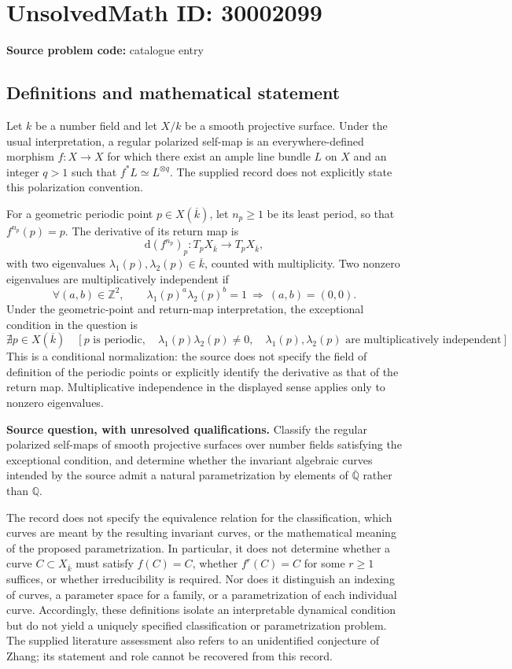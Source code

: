 \documentclass[11pt]{article}
\newcommand{\Z}{\mathbb{Z}}
\newcommand{\Q}{\mathbb{Q}}
\begin{document}
\section*{UnsolvedMath ID: 30002099}
\textbf{Source problem code:} catalogue entry
\subsection{Definitions and mathematical statement}
Let \(k\) be a number field and let \(X/k\) be a smooth projective surface. Under the usual interpretation, a regular polarized self-map is an everywhere-defined morphism \(f\colon X\to X\) for which there exist an ample line bundle \(L\) on \(X\) and an integer \(q>1\) such that \(f^*L\simeq L^{\otimes q}\). The supplied record does not explicitly state this polarization convention.

For a geometric periodic point \(p\in X(\overline{k})\), let \(n_p\geq 1\) be its least period, so that \(f^{n_p}(p)=p\). The derivative of its return map is
\[
\mathrm{d}(f^{n_p})_p\colon T_pX_{\overline{k}}\longrightarrow T_pX_{\overline{k}},
\]
with two eigenvalues \(\lambda_1(p),\lambda_2(p)\in\overline{k}\), counted with multiplicity. Two nonzero eigenvalues are multiplicatively independent if
\[
\forall(a,b)\in\Z^2,\qquad
\lambda_1(p)^a\lambda_2(p)^b=1
\ \Longrightarrow\ (a,b)=(0,0).
\]
Under the geometric-point and return-map interpretation, the exceptional condition in the question is
\[
\nexists p\in X(\overline{k})\quad
\left[
 p\text{ is periodic},\quad
 \lambda_1(p)\lambda_2(p)\ne 0,\quad
 \lambda_1(p),\lambda_2(p)\text{ are multiplicatively independent}
\right].
\]
This is a conditional normalization: the source does not specify the field of definition of the periodic points or explicitly identify the derivative as that of the return map. Multiplicative independence in the displayed sense applies only to nonzero eigenvalues.

\textbf{Source question, with unresolved qualifications.} Classify the regular polarized self-maps of smooth projective surfaces over number fields satisfying the exceptional condition, and determine whether the invariant algebraic curves intended by the source admit a natural parametrization by elements of \(\overline{\Q}\) rather than \(\Q\).

The record does not specify the equivalence relation for the classification, which curves are meant by the resulting invariant curves, or the mathematical meaning of the proposed parametrization. In particular, it does not determine whether a curve \(C\subset X_{\overline{k}}\) must satisfy \(f(C)=C\), whether \(f^r(C)=C\) for some \(r\geq1\) suffices, or whether irreducibility is required. Nor does it distinguish an indexing of curves, a parameter space for a family, or a parametrization of each individual curve. Accordingly, these definitions isolate an interpretable dynamical condition but do not yield a uniquely specified classification or parametrization problem. The supplied literature assessment also refers to an unidentified conjecture of Zhang; its statement and role cannot be recovered from this record.
\end{document}
